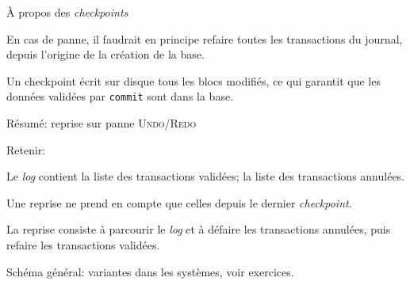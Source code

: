 \documentclass[aspectratio=169, handout]{beamer} %
\begin{document}
\begin{frame}{À propos des \textit{checkpoints}}


En cas de panne, il faudrait en principe refaire
toutes les transactions du journal, \alert{depuis l'origine
de la création de la base}.

\vfill

Un \alert{checkpoint} écrit sur disque tous les blocs
modifiés, ce qui garantit que les données validées par
\texttt{commit}
sont dans la base. 

\vfill


\end{frame}

\begin{frame}{Résumé: reprise sur panne \textsc{Undo/Redo}}

Retenir:

\vfill

\begin{redbullet}

  \item Le \textit{log} contient la liste des transactions
      validées; la liste des transactions annulées.
      
  \item Une reprise ne prend en compte que celles depuis le dernier \textit{checkpoint}.
  
  \item La reprise consiste à parcourir le \textit{log} et à \alert{défaire} les
     transactions annulées, puis \alert{refaire} les transactions validées.
 \end{redbullet}

\vfill

\begin{blocgauche}
Schéma général: variantes dans les systèmes, voir
exercices.
\end{blocgauche}
\vfill
{}

\end{frame}
\end{document}
